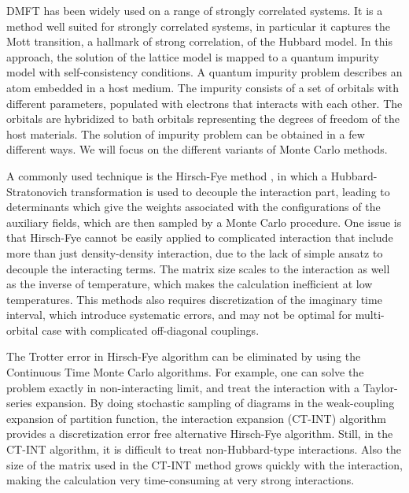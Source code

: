 

DMFT has been widely used on a range of strongly correlated systems. 
It is a method well suited for strongly correlated systems, in particular it 
captures the Mott transition, a hallmark of strong correlation, of the Hubbard 
model. In this approach, the solution of the lattice model is mapped to a 
quantum impurity model with self-consistency conditions. 
A quantum impurity problem describes an atom embedded in a host medium. 
The impurity consists of a set of orbitals with different parameters, populated
with electrons that interacts with each other. The orbitals are hybridized to 
bath orbitals representing the degrees of freedom of the host materials. 
The solution of impurity problem can be obtained in a few different ways. 
We will focus on the different variants of Monte Carlo methods.

A commonly used technique is the Hirsch-Fye method \cite{1986PhRvL..56.2521H}, in which a 
Hubbard-Stratonovich transformation is used to decouple the interaction part,
leading to determinants which give the weights associated with the 
configurations of the auxiliary fields, which are then sampled by a Monte Carlo 
procedure. One issue is that Hirsch-Fye cannot be easily applied to complicated
interaction that include more than just density-density interaction, due to the
lack of simple ansatz to decouple the interacting terms. 
The matrix size scales to the interaction as well as the inverse of 
temperature, which makes the calculation inefficient at low temperatures.
This methods also requires discretization of the imaginary time interval,
which introduce systematic errors, and may not be optimal for multi-orbital case 
with complicated off-diagonal couplings.

The Trotter error in Hirsch-Fye algorithm can be eliminated by using the 
Continuous Time Monte Carlo algorithms. For example, one can solve the problem 
exactly in non-interacting limit, and treat the interaction with a Taylor-series
 expansion. By doing stochastic sampling of diagrams in the weak-coupling 
expansion of partition function, the interaction expansion (CT-INT) algorithm
\cite{2005PhRvB..72c5122R}
provides a discretization error free alternative Hirsch-Fye algorithm.
Still, in the CT-INT algorithm, it is difficult to treat non-Hubbard-type 
interactions. Also the size of the matrix used in the CT-INT method grows
quickly with the interaction, making the calculation very time-consuming at 
very strong interactions.

